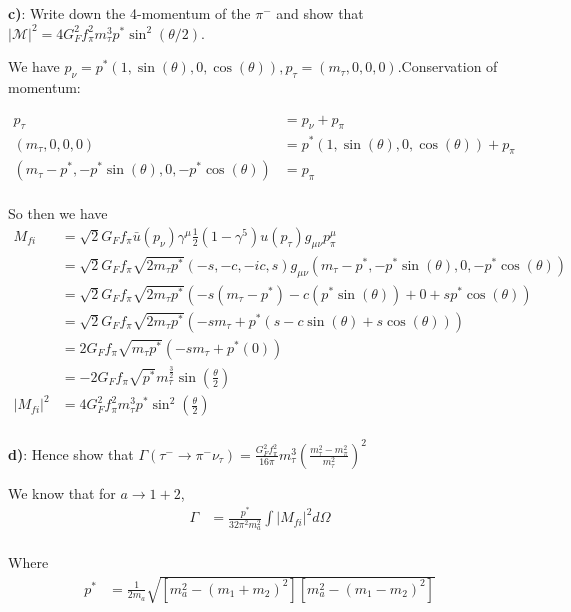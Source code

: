 \textbf{c)}: Write down the 4-momentum of the $\pi^-$ and show that $|\mathcal{M}|^2 = 4 G_F^2 f_\pi^2 m_\tau^3 p^* \sin^2(\theta/2)$.

We have $p_\nu = p^*(1, \sin(\theta), 0, \cos(\theta)), p_\tau = (m_\tau, 0, 0, 0)$.Conservation of momentum:

\begin{align*}
    p_\tau &= p_\nu + p_\pi\\
    (m_\tau, 0, 0, 0) &= p^*(1, \sin(\theta), 0, \cos(\theta)) + p_\pi\\
    (m_\tau - p^*, -p^*\sin(\theta), 0, -p^*\cos(\theta)) &= p_\pi\\
\end{align*}

So then we have
\begin{align*}
    M_{fi} 
    &= \sqrt{2} G_F f_\pi \bar{u}(p_\nu)\gamma^\mu\frac{1}{2}(1-\gamma^5) u(p_\tau) g_{\mu\nu} p_\pi^\mu \\
    &= \sqrt{2} G_F f_\pi \sqrt{2 m_\tau p^*}(-s, -c, -ic, s) g_{\mu\nu} (m_\tau - p^*, -p^*\sin(\theta), 0, -p^*\cos(\theta)) \\
    &= \sqrt{2} G_F f_\pi \sqrt{2 m_\tau p^*}(-s(m_\tau - p^*) - c(p^*\sin(\theta)) + 0 + sp^*\cos(\theta)) \\
    &= \sqrt{2} G_F f_\pi \sqrt{2 m_\tau p^*}(-sm_\tau + p^*(s - c\sin(\theta) + s\cos(\theta))) \\
    &= 2 G_F f_\pi \sqrt{m_\tau p^*}(-sm_\tau + p^*(0)) \\
    &= -2 G_F f_\pi \sqrt{p^*}m_\tau^{\frac{3}{2}}\sin\left(\frac{\theta}{2}\right)  \\
    |M_{fi}|^2 &= 4 G_F^2 f_\pi^2 m_\tau^3 p^* \sin^2\left(\frac{\theta}{2}\right) \\
\end{align*}

\textbf{d)}: Hence show that $\Gamma(\tau^- \to \pi^- \nu_\tau) = \frac{G_F^2 f_\pi^2}{16\pi} m_\tau^3 \left(\frac{m_\tau^2 - m_\pi^2}{m_\tau^2}\right)^2$

We know that for $a \to 1 + 2$,
\begin{align*}
    \Gamma &= \frac{p^*}{32\pi^2 m_a^2} \int |M_{fi}|^2 d\Omega \\
\end{align*}

Where
\begin{align*}
    p^* &= \frac{1}{2m_a}\sqrt{\left[m_a^2 - (m_1+m_2)^2\right]\left[m_a^2 - (m_1-m_2)^2\right]} \\
\end{align*}

